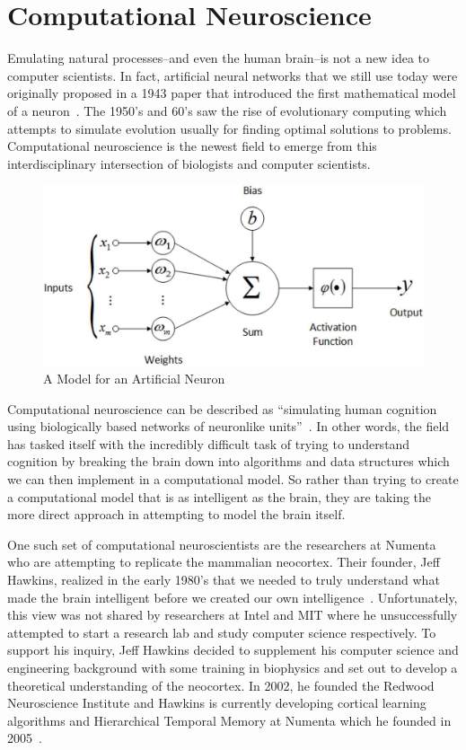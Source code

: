 \documentclass[oneside,12pt,openany]{book}
\begin{document}
	\section{Computational Neuroscience}
	
	Emulating natural processes--and even the human brain--is not a new idea to computer scientists. In fact, artificial neural networks that we still use today were originally proposed in a 1943 paper that introduced the first mathematical model of a neuron~\cite{FundNatComp}. The 1950's and 60's saw the rise of evolutionary computing which attempts to simulate evolution usually for finding optimal solutions to problems. Computational neuroscience is the newest field to emerge from this interdisciplinary intersection of biologists and computer scientists.
	
	\begin{figure}[!ht]
		\centering
		\includegraphics[width=.8\linewidth]{images/ArtificialNeuron.jpg}
		\caption{A Model for an Artificial Neuron}
		\label{fig:ArtNeuron}
	\end{figure}
	
	Computational neuroscience can be described as ``simulating human cognition using biologically based networks of neuronlike units''~\cite{Eberhart}. In other words, the field has tasked itself with the incredibly difficult task of trying to understand cognition by breaking the brain down into algorithms and data structures which we can then implement in a computational model. So rather than trying to create a computational model that is as intelligent as the brain, they are taking the more direct approach in attempting to model the brain itself.
	
	One such set of computational neuroscientists are the researchers at Numenta who are attempting to replicate the mammalian neocortex. Their founder, Jeff Hawkins, realized in the early 1980's that we needed to truly understand what made the brain intelligent before we created our own intelligence~\cite{OnIntelligence}. Unfortunately, this view was not shared by  researchers at Intel and MIT where he unsuccessfully attempted to start a research lab and study computer science respectively. To support his inquiry, Jeff Hawkins decided to supplement his computer science and engineering background with some training in biophysics and set out to develop a theoretical understanding of the neocortex. In 2002, he founded the Redwood Neuroscience Institute and Hawkins is currently developing cortical learning algorithms and Hierarchical Temporal Memory at Numenta which he founded in 2005~\cite{OnIntelligence}. 
	
\end{document}

